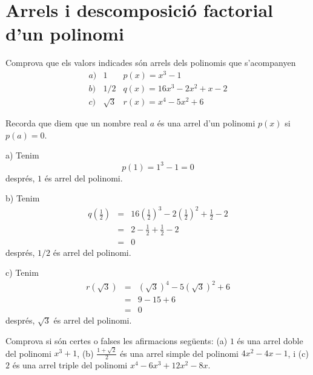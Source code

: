 \section{Arrels i descomposició factorial d'un polinomi}

\begin{exercici}
Comprova que els valors indicades són arrels dels polinomis
que s'acompanyen\[
\begin{array}{lll}
a) & 1 & p(x)=x^{3}-1 \\
b) & 1/2 & q(x)=16x^{3}-2x^{2}+x-2 \\
c) & \sqrt{3} & r(x)=x^{4}-5x^{2}+6\end{array}\]
\end{exercici}

\begin{solucio}
Recorda que diem que un nombre real $a$ és una arrel d'un
polinomi $p(x)$ si $p(a)=0$.

a) Tenim\[
p(1)=1^{3}-1=0
\]després, $1$ és arrel del polinomi.

b) Tenim\begin{eqnarray*}
q\left( \frac{1}{2}\right) &=&16\left( \frac{1}{2}\right) ^{3}-2\left( \frac{1}{2}\right) ^{2}+\frac{1}{2}-2 \\
&=&2-\frac{1}{2}+\frac{1}{2}-2 \\
&=&0
\end{eqnarray*}després, $1/2$ és arrel del polinomi.

c) Tenim\begin{eqnarray*}
r\left( \sqrt{3}\right) &=&\left( \sqrt{3}\right) ^{4}-5\left( \sqrt{3}\right) ^{2}+6 \\
&=&9-15+6 \\
&=&0
\end{eqnarray*}després, $\sqrt{3}$ és arrel del polinomi.
\end{solucio}

\begin{exercici}
Comprova si són certes o falses les afirmacions següents: (a) $1$ és
una arrel doble del polinomi $x^{3}+1$, (b) $\frac{1+\sqrt{2}}{2}$ és
una arrel simple del polinomi $4x^{2}-4x-1$, i (c) $2$ és una arrel
triple del polinomi $x^{4}-6x^{3}+12x^{2}-8x$.
\end{exercici}


